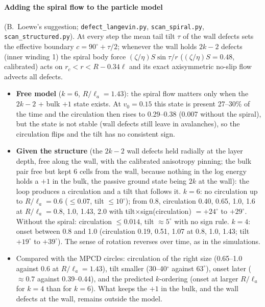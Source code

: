 \paragraph{Adding the spiral flow to the particle model} (B.~Loewe's suggestion; \texttt{defect\_langevin.py}, \texttt{scan\_spiral.py},
\texttt{scan\_structured.py}). At every step the mean tail tilt $\tau$ of the wall defects sets the effective boundary $c=90^\circ+\tau/2$; whenever the
wall holds $2k-2$ defects (inner winding 1) the spiral body force $(\zeta/\eta)S\sin\tau/r$ ($(\zeta/\eta)S=0.48$, calibrated) acts on
$r_c<r<R-0.34\ell$ and its exact axisymmetric no-slip flow advects all defects.
\begin{itemize}
  \item \textbf{Free model} ($k=6$, $R/\ell_a=1.43$): the spiral flow matters only when the $2k-2$ + bulk $+1$ state exists. At $v_0=0.15$ this state is
        present 27--30\% of the time and the circulation then rises to 0.29--0.38 (0.007 without the spiral), but the state is not stable (wall defects still
        leave in avalanches), so the circulation flips and the tilt has no consistent sign.
  \item \textbf{Given the structure} (the $2k-2$ wall defects held radially at the layer depth, free along the wall, with the calibrated anisotropy
        pinning; the bulk pair free but kept 6 cells from the wall, because nothing in the log energy holds a $+1$ in the bulk, the passive ground state being
        $2k$ at the wall): the loop produces a circulation and a tilt that follows it. $k=6$: no circulation up to $R/\ell_a=0.6$ ($\le0.07$, tilt
        $\le10^\circ$); from 0.8, circulation 0.40, 0.65, 1.0, 1.6 at $R/\ell_a=0.8$, 1.0, 1.43, 2.0 with tilt$\times$sign(circulation) $=+24^\circ$ to
        $+29^\circ$. Without the spiral: circulation $\le0.014$, tilt $\approx5^\circ$ with no sign rule. $k=4$: onset between 0.8 and 1.0 (circulation 0.19,
        0.51, 1.07 at 0.8, 1.0, 1.43; tilt $+19^\circ$ to $+39^\circ$). The sense of rotation reverses over time, as in the simulations.
  \item Compared with the MPCD circles: circulation of the right size (0.65--1.0 against 0.6 at $R/\ell_a=1.43$), tilt smaller (30--40$^\circ$ against
        $63^\circ$), onset later ($\approx0.7$ against 0.39--0.44), and the predicted $k$-ordering (onset at larger $R/\ell_a$ for $k=4$ than for $k=6$). What keeps
        the $+1$ in the bulk, and the wall defects at the wall, remains outside the model.
\end{itemize}

